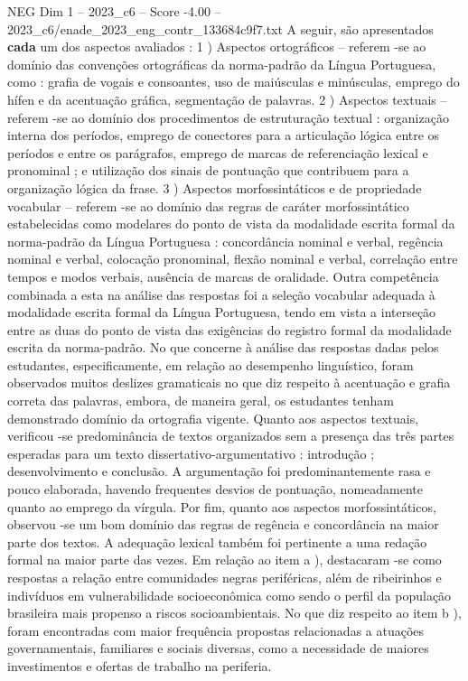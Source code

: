 \begin{textsample}{NEG Dim 1 – 2023\_c6 – Score -4.00 – 2023\_c6/enade\_2023\_eng\_contr\_133684c9f7.txt}
A seguir, são apresentados \textbf{cada} um dos aspectos avaliados : 1 ) Aspectos ortográficos – referem -se ao domínio das convenções ortográficas da norma-padrão da Língua Portuguesa, como : grafia de vogais e consoantes, uso de maiúsculas e minúsculas, emprego do hífen e da acentuação gráfica, segmentação de palavras. 2 ) Aspectos textuais – referem -se ao domínio dos procedimentos de estruturação textual : organização interna dos períodos, emprego de conectores para a articulação lógica entre os períodos e entre os parágrafos, emprego de marcas de referenciação lexical e pronominal ; e utilização dos sinais de pontuação que contribuem para a organização lógica da frase. 3 ) Aspectos morfossintáticos e de propriedade vocabular – referem -se ao domínio das regras de caráter morfossintático estabelecidas como modelares do ponto de vista da modalidade escrita formal da norma-padrão da Língua Portuguesa : concordância nominal e verbal, regência nominal e verbal, colocação pronominal, flexão nominal e verbal, correlação entre tempos e modos verbais, ausência de marcas de oralidade.
Outra competência combinada a esta na análise das respostas foi a seleção vocabular adequada à modalidade escrita formal da Língua Portuguesa, tendo em vista a interseção entre as duas do ponto de vista das exigências do registro formal da modalidade escrita da norma-padrão.
No que concerne à análise das respostas dadas pelos estudantes, especificamente, em relação ao desempenho linguístico, foram observados muitos deslizes gramaticais no que diz respeito à acentuação e grafia correta das palavras, embora, de maneira geral, os estudantes tenham demonstrado domínio da ortografia vigente.
Quanto aos aspectos textuais, verificou -se predominância de textos organizados sem a presença das três partes esperadas para um texto dissertativo-argumentativo : introdução ; desenvolvimento e conclusão.
A argumentação foi predominantemente rasa e pouco elaborada, havendo frequentes desvios de pontuação, nomeadamente quanto ao emprego da vírgula.
Por fim, quanto aos aspectos morfossintáticos, observou -se um bom domínio das regras de regência e concordância na maior parte dos textos.
A adequação lexical também foi pertinente a uma redação formal na maior parte das vezes.
Em relação ao item a ), destacaram -se como respostas a relação entre comunidades negras periféricas, além de ribeirinhos e indivíduos em vulnerabilidade socioeconômica como sendo o perfil da população brasileira mais propenso a riscos socioambientais.
No que diz respeito ao item b ), foram encontradas com maior frequência propostas relacionadas a atuações governamentais, familiares e sociais diversas, como a necessidade de maiores investimentos e ofertas de trabalho na periferia.

\end{textsample}
